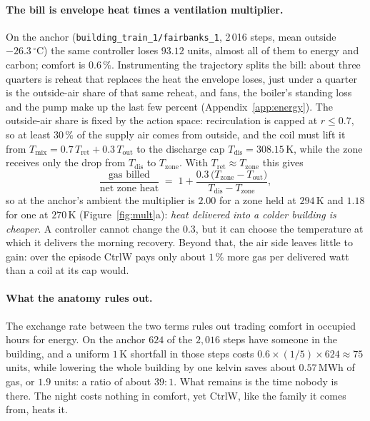 \paragraph{The bill is envelope heat times a ventilation multiplier.} On the anchor
(\texttt{building\_train\_1/fairbanks\_1}, 2\,016 steps, mean outside $-26.3\,^\circ$C) the same
controller loses $93.12$ units, almost all of them to energy and carbon; comfort is $0.6\,\%$.
Instrumenting the trajectory splits the bill: about three quarters is reheat that replaces the
heat the envelope loses, just under a quarter is the outside-air share of that same reheat, and
fans, the boiler's standing loss and the pump make up the last few percent
(Appendix~\ref{app:energy}). %
The outside-air share is fixed by the action space: recirculation is capped at $r\le0.7$, so at
least $30\,\%$ of the supply air comes from outside, and the coil must lift it from
$T_{\text{mix}}=0.7\,T_{\text{ret}}+0.3\,T_{\text{out}}$ to the discharge cap
$T_{\text{dis}}=308.15$\,K, while the zone receives only the drop from $T_{\text{dis}}$ to
$T_{\text{zone}}$. With $T_{\text{ret}}\approx T_{\text{zone}}$ this gives
\begin{equation}
\frac{\text{gas billed}}{\text{net zone heat}}\;=\;
1+\frac{0.3\,\big(T_{\text{zone}}-T_{\text{out}}\big)}{T_{\text{dis}}-T_{\text{zone}}},
\label{eq:mult}
\end{equation}
so at the anchor's ambient the multiplier is $2.00$ for a zone held at $294$\,K and $1.18$ for one
at $270$\,K (Figure~\ref{fig:mult}a): \emph{heat delivered into a colder building is cheaper}. A
controller cannot change the $0.3$, but it can choose the temperature at which it delivers the
morning recovery. Beyond that, the air side leaves little to gain: over the episode CtrlW pays
only about $1\,\%$ more gas per delivered watt than a coil at its cap would.

\paragraph{What the anatomy rules out.} The exchange rate between the two terms rules out
trading comfort in occupied hours for energy. On the anchor $624$ of the $2{,}016$ steps have
someone in the building, and a uniform $1$\,K shortfall in those steps costs
$0.6\times(1/5)\times624\approx75$ units, while lowering the whole building by one kelvin saves
about $0.57$\,MWh of gas, or $1.9$ units: a ratio of about $39{:}1$. What remains is the time
nobody is there. The night costs nothing in comfort, yet CtrlW, like the family it comes from,
heats it.

